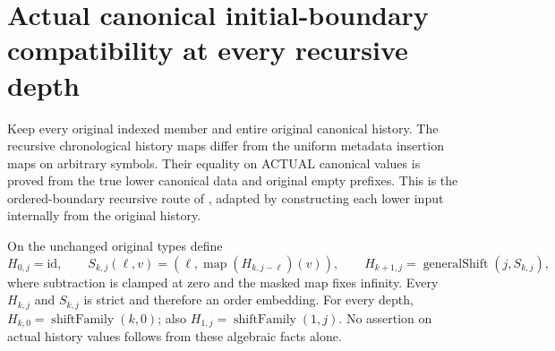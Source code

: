\section{Actual canonical initial-boundary compatibility at every recursive depth}

Keep every original indexed member and entire original canonical history.
The recursive chronological history maps differ from the uniform metadata
insertion maps on arbitrary symbols. Their equality on ACTUAL canonical
values is proved from the true lower canonical data and original empty
prefixes. This is the ordered-boundary recursive route of
\cite{wlodarczyk05-hironaka,bierstone-milman08-functoriality}, adapted by
constructing each lower input internally from the original history.

\begin{lemma}
\label{hir:original-recursive-chronological-history-value-maps}
\leanok
On the unchanged original types define
\[
 H_{0,j}=\mathrm{id},\qquad
 S_{k,j}(\ell,v)=(\ell,\operatorname{map}(H_{k,j-\ell})(v)),\qquad
 H_{k+1,j}=\operatorname{generalShift}(j,S_{k,j}),
\]
where subtraction is clamped at zero and the masked map fixes infinity.
Every $H_{k,j}$ and $S_{k,j}$ is strict and therefore an order embedding.
For every depth, $H_{k,0}=\operatorname{shiftFamily}(k,0)$; also
$H_{1,j}=\operatorname{shiftFamily}(1,j)$.
No assertion on actual history values follows from these algebraic facts alone.
\end{lemma}
